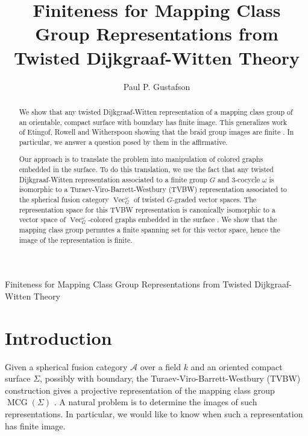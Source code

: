 \documentclass{ws-jktr}
\DeclareMathOperator{\MCG}{MCG}
\DeclareMathOperator{\Vect}{Vec}
\newcommand{\Si}{\Sigma}
\begin{document}
{Finiteness for Mapping Class Group Representations from Twisted Dijkgraaf-Witten Theory}

\catchline{}{}{}{}{}

\title{Finiteness for Mapping Class Group Representations from Twisted Dijkgraaf-Witten Theory}

\author{Paul P. Gustafson}
\address{Department of Mathematics,
    Texas A\&M University,
    College Station, TX
    U.S.A.}

\maketitle

\begin{abstract}
We show that any twisted Dijkgraaf-Witten representation of a mapping class group of an orientable, compact surface with boundary has finite image. This generalizes work of Etingof, Rowell and Witherspoon showing that the braid group images are finite \cite{erw}.  In particular, we answer a question posed by them in the affirmative.

Our approach is to translate the problem into manipulation of colored graphs embedded in the surface. To do this translation, we use the fact that any twisted Dijkgraaf-Witten representation associated to a finite group $G$ and 3-cocycle $\omega$ is isomorphic to a Turaev-Viro-Barrett-Westbury (TVBW) representation associated to the spherical fusion category $\Vect_G^\omega$ of twisted $G$-graded vector spaces. The representation space for this TVBW representation is canonically isomorphic to a vector space of $\Vect_G^\omega$-colored graphs embedded in the surface \cite{kirillovStringNets}.   We show that the mapping class group permutes a finite spanning set for this vector space, hence the image of the representation is finite.
\end{abstract}



\section{Introduction}
Given a spherical fusion category $\mathcal A$ over a field $k$ and an oriented compact surface $\Si$, possibly with boundary, the Turaev-Viro-Barrett-Westbury (TVBW) construction gives a projective representation of the mapping class group $\MCG(\Si)$ \cite{TURAEV1992865, hep-th/9311155}.  A natural problem is to determine the images of such representations.  In particular, we would like to know when such a representation has finite image.
\end{document}
